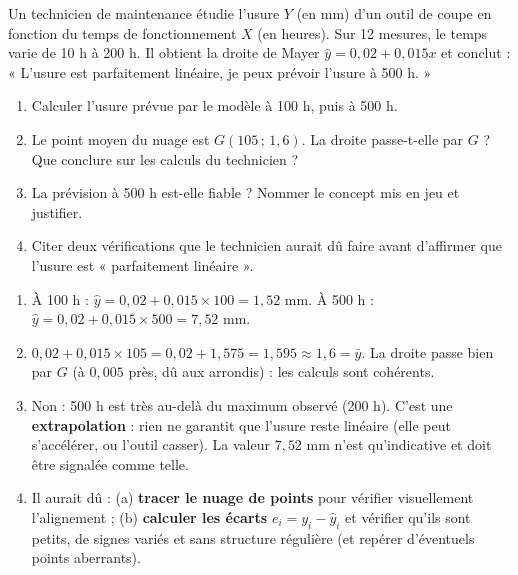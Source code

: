 \documentclass[11pt]{article}
\begin{document}
\begin{exercice}
Un technicien de maintenance étudie l'usure $Y$ (en mm) d'un outil de coupe en fonction du temps de fonctionnement $X$ (en heures). Sur 12 mesures, le temps varie de 10 h à 200 h. Il obtient la droite de Mayer $\hat{y} = 0{,}02 + 0{,}015x$ et conclut : « L'usure est parfaitement linéaire, je peux prévoir l'usure à 500 h. »
\begin{enumerate}
    \item Calculer l'usure prévue par le modèle à 100 h, puis à 500 h.
    \item Le point moyen du nuage est $G(105\,;\,1{,}6)$. La droite passe-t-elle par $G$ ? Que conclure sur les calculs du technicien ?
    \item La prévision à 500 h est-elle fiable ? Nommer le concept mis en jeu et justifier.
    \item Citer deux vérifications que le technicien aurait dû faire avant d'affirmer que l'usure est « parfaitement linéaire ».
\end{enumerate}
\end{exercice}

\begin{corrige}[Exercice 5.1]
\begin{enumerate}
    \item À 100 h : $\hat{y} = 0{,}02 + 0{,}015 \times 100 = 1{,}52$ mm. À 500 h : $\hat{y} = 0{,}02 + 0{,}015 \times 500 = 7{,}52$ mm.
    \item $0{,}02 + 0{,}015 \times 105 = 0{,}02 + 1{,}575 = 1{,}595 \approx 1{,}6 = \bar{y}$. La droite passe bien par $G$ (à $0{,}005$ près, dû aux arrondis) : les calculs sont cohérents.
    \item Non : 500 h est très au-delà du maximum observé (200 h). C'est une \textbf{extrapolation} : rien ne garantit que l'usure reste linéaire (elle peut s'accélérer, ou l'outil casser). La valeur $7{,}52$ mm n'est qu'indicative et doit être signalée comme telle.
    \item Il aurait dû : (a) \textbf{tracer le nuage de points} pour vérifier visuellement l'alignement ; (b) \textbf{calculer les écarts} $e_i = y_i - \hat{y}_i$ et vérifier qu'ils sont petits, de signes variés et sans structure régulière (et repérer d'éventuels points aberrants).
\end{enumerate}
\end{corrige}
\end{document}
